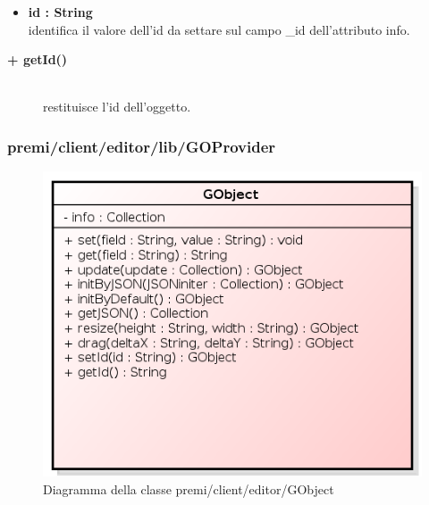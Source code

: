 \begin{description}
\begin{description}
\begin{description}
\begin{itemize}
					\item \textbf{id : String			} \hfill \\
					identifica il valore dell'id da settare sul campo \_id dell'attributo info.
				\end{itemize}
		\end{description}
		
\end{description}

\begin{description}
		\item[\textbf{\color{blue}+ getId()			}] \hfill \\
			restituisce l'id dell'oggetto.
\end{description}


\end{description}

\subsubsection{premi/client/editor/lib/GOProvider}
\begin{figure}[h]
\begin{center}
\includegraphics[scale=0.40]{img/diacla/GObject.png}
\caption{Diagramma della classe premi/client/editor/GObject}
\end{center}
\end{figure}

